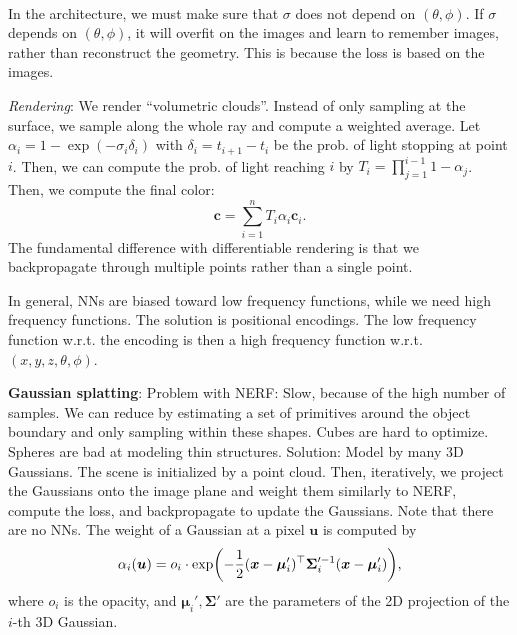 \documentclass{article}
\newcommand{\lft}{\mathopen{}\mathclose\bgroup\left}
\newcommand{\rgt}{\aftergroup\egroup\right}
\renewcommand{\vec}[1]{\bm{#1}}
\newcommand{\mat}[1]{\bm{#1}}
\newenvironment{topic}[1]
{\textbf{\sffamily \colorbox{black}{\rlap{\textbf{\textcolor{white}{#1}}}\hspace{\linewidth}\hspace{-2\fboxsep}}} \\ \vspace{0.2cm}}
{}
\begin{document}
\begin{multicols*}{2}
\begin{topic}{Implicit surfaces and neural radiance fields}
        In the architecture, we must make sure that $\sigma$ does not depend on $(\theta,\phi)$. If
        $\sigma$ depends on $(\theta,\phi)$, it will overfit on the images and learn to remember images,
        rather than reconstruct the geometry. This is because the loss is based on the images.

        \textit{Rendering}: We render ``volumetric clouds''. Instead of only sampling at the surface, we sample
        along the whole ray and compute a weighted average. Let $\alpha_i = 1 - \exp(-\sigma_i \delta_i)$
        with $\delta_i = t_{i+1} - t_i$ be the prob. of light stopping at point $i$. Then, we can compute
        the prob. of light reaching $i$ by $T_i = \prod_{j=1}^{i-1} 1 - \alpha_j$. Then, we compute
        the final color: \[
            \vec{c} = \sum_{i=1}^{n} T_i \alpha_i \vec{c}_i.
        \]
        The fundamental difference with differentiable rendering is that we backpropagate through multiple
        points rather than a single point.

        In general, NNs are biased toward low frequency functions, while we need high frequency functions.
        The solution is positional encodings. The low frequency function w.r.t. the encoding is then a high
        frequency function w.r.t. $(x,y,z,\theta,\phi)$.

        \textbf{Gaussian splatting}: Problem with NERF: Slow, because of the high number of samples.
        We can reduce by estimating a set of primitives around the object boundary and only sampling
        within these shapes. Cubes are hard to optimize. Spheres are bad at modeling thin structures.
        Solution: Model by many 3D Gaussians. The scene is initialized by a point cloud. Then,
        iteratively, we project the Gaussians onto the image plane and weight them similarly to NERF,
        compute the loss, and backpropagate to update the Gaussians. Note that there are no
        NNs. The weight of a Gaussian at a pixel $\vec{u}$ is computed by \[
            \alpha_i(\vec{u}) = o_i \cdot \exp \lft( -\frac{1}{2} (\vec{x} - \vec{\mu}_i')^\top \mat{\Sigma}_i'^{-1} (\vec{x} - \vec{\mu}_i') \rgt),
        \]
        where $o_i$ is the opacity, and $\vec{\mu}_i', \mat{\Sigma}'$ are the parameters of the 2D
        projection of the $i$-th 3D Gaussian.
    \end{topic}


\end{multicols*}
\end{document}
